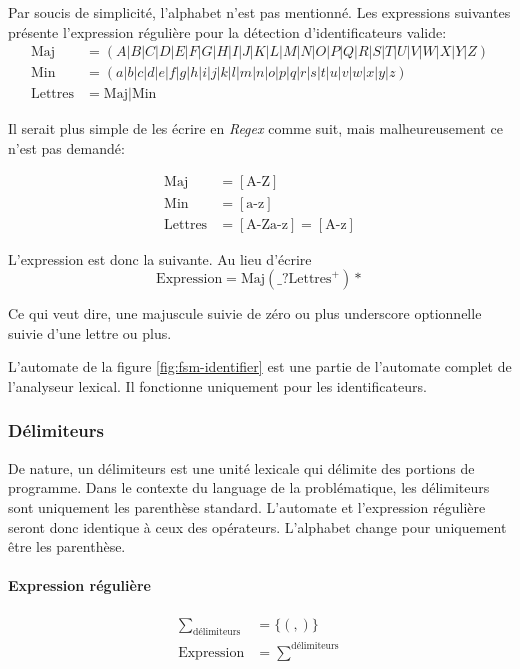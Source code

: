 Par soucis de simplicité, l'alphabet n'est pas mentionné. Les expressions suivantes présente l'expression régulière pour la détection d'identificateurs valide:
\begin{align}
  \textrm{Maj} &= (A|B|C|D|E|F|G|H|I|J|K|L|M|N|O|P|Q|R|S|T|U|V|W|X|Y|Z) \\
  \textrm{Min} &= (a|b|c|d|e|f|g|h|i|j|k|l|m|n|o|p|q|r|s|t|u|v|w|x|y|z) \\
  \textrm{Lettres} &= \textrm{Maj} | \textrm{Min}
\end{align}

Il serait plus simple de les écrire en \textit{Regex} comme suit, mais
malheureusement ce n'est pas demandé:

\begin{align}
  \text{Maj} &= [\textrm{A-Z}] \\
  \text{Min} &= [\textrm{a-z}] \\
  \text{Lettres} &= [\textrm{A-Za-z}] = [\textrm{A-z}]
\end{align}

L'expression est donc la suivante. Au lieu d'écrire
\begin{equation}
  \textrm{Expression}=\textrm{Maj} (\_?\textrm{Lettres}^+)*
\end{equation}

Ce qui veut dire, une majuscule suivie de zéro ou plus underscore optionnelle suivie d'une lettre ou plus.


L'automate de la figure \ref{fig:fsm-identifier} est une partie de l'automate
complet de l'analyseur lexical. Il fonctionne uniquement pour les
identificateurs.


\subsubsection{Délimiteurs}

De nature, un délimiteurs est une unité lexicale qui délimite des portions de
programme. Dans le contexte du language de la problématique, les délimiteurs
sont uniquement les parenthèse standard. L'automate et l'expression régulière
seront donc identique à ceux des opérateurs. L'alphabet change pour
uniquement être les parenthèse.

\paragraph{Expression régulière}

\begin{align}
 \sum_{\textrm{délimiteurs}} &=\{(,)\}  \\
\textrm{Expression} &=\sum^{\textrm{délimiteurs}}
\end{align}

